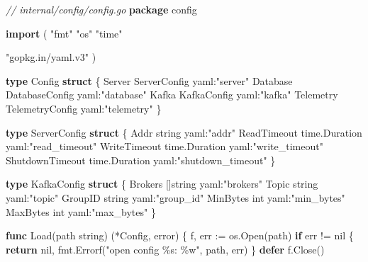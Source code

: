\documentclass[
]{article}
\newenvironment{Shaded}{}{}
\newcommand{\CommentTok}[1]{\textcolor[rgb]{0.38,0.63,0.69}{\textit{#1}}}
\newcommand{\ControlFlowTok}[1]{\textcolor[rgb]{0.00,0.44,0.13}{\textbf{#1}}}
\newcommand{\DataTypeTok}[1]{\textcolor[rgb]{0.56,0.13,0.00}{#1}}
\newcommand{\KeywordTok}[1]{\textcolor[rgb]{0.00,0.44,0.13}{\textbf{#1}}}
\newcommand{\NormalTok}[1]{#1}
\newcommand{\OperatorTok}[1]{\textcolor[rgb]{0.40,0.40,0.40}{#1}}
\newcommand{\OtherTok}[1]{\textcolor[rgb]{0.00,0.44,0.13}{#1}}
\newcommand{\StringTok}[1]{\textcolor[rgb]{0.25,0.44,0.63}{#1}}
\begin{document}
\begin{Shaded}
\begin{Highlighting}[]
\CommentTok{// internal/config/config.go}
\KeywordTok{package}\NormalTok{ config}

\KeywordTok{import} \OperatorTok{(}
    \StringTok{"fmt"}
    \StringTok{"os"}
    \StringTok{"time"}

    \StringTok{"gopkg.in/yaml.v3"}
\OperatorTok{)}

\KeywordTok{type}\NormalTok{ Config }\KeywordTok{struct} \OperatorTok{\{}
\NormalTok{    Server   ServerConfig   }\StringTok{\textasciigrave{}yaml:"server"\textasciigrave{}}
\NormalTok{    Database DatabaseConfig }\StringTok{\textasciigrave{}yaml:"database"\textasciigrave{}}
\NormalTok{    Kafka    KafkaConfig    }\StringTok{\textasciigrave{}yaml:"kafka"\textasciigrave{}}
\NormalTok{    Telemetry TelemetryConfig }\StringTok{\textasciigrave{}yaml:"telemetry"\textasciigrave{}}
\OperatorTok{\}}

\KeywordTok{type}\NormalTok{ ServerConfig }\KeywordTok{struct} \OperatorTok{\{}
\NormalTok{    Addr            }\DataTypeTok{string}        \StringTok{\textasciigrave{}yaml:"addr"\textasciigrave{}}
\NormalTok{    ReadTimeout     time}\OperatorTok{.}\NormalTok{Duration }\StringTok{\textasciigrave{}yaml:"read\_timeout"\textasciigrave{}}
\NormalTok{    WriteTimeout    time}\OperatorTok{.}\NormalTok{Duration }\StringTok{\textasciigrave{}yaml:"write\_timeout"\textasciigrave{}}
\NormalTok{    ShutdownTimeout time}\OperatorTok{.}\NormalTok{Duration }\StringTok{\textasciigrave{}yaml:"shutdown\_timeout"\textasciigrave{}}
\OperatorTok{\}}

\KeywordTok{type}\NormalTok{ KafkaConfig }\KeywordTok{struct} \OperatorTok{\{}
\NormalTok{    Brokers  }\OperatorTok{[]}\DataTypeTok{string} \StringTok{\textasciigrave{}yaml:"brokers"\textasciigrave{}}
\NormalTok{    Topic    }\DataTypeTok{string}   \StringTok{\textasciigrave{}yaml:"topic"\textasciigrave{}}
\NormalTok{    GroupID  }\DataTypeTok{string}   \StringTok{\textasciigrave{}yaml:"group\_id"\textasciigrave{}}
\NormalTok{    MinBytes }\DataTypeTok{int}      \StringTok{\textasciigrave{}yaml:"min\_bytes"\textasciigrave{}}
\NormalTok{    MaxBytes }\DataTypeTok{int}      \StringTok{\textasciigrave{}yaml:"max\_bytes"\textasciigrave{}}
\OperatorTok{\}}

\KeywordTok{func}\NormalTok{ Load}\OperatorTok{(}\NormalTok{path }\DataTypeTok{string}\OperatorTok{)} \OperatorTok{(*}\NormalTok{Config}\OperatorTok{,} \DataTypeTok{error}\OperatorTok{)} \OperatorTok{\{}
\NormalTok{    f}\OperatorTok{,}\NormalTok{ err }\OperatorTok{:=}\NormalTok{ os}\OperatorTok{.}\NormalTok{Open}\OperatorTok{(}\NormalTok{path}\OperatorTok{)}
    \ControlFlowTok{if}\NormalTok{ err }\OperatorTok{!=} \OtherTok{nil} \OperatorTok{\{}
        \ControlFlowTok{return} \OtherTok{nil}\OperatorTok{,}\NormalTok{ fmt}\OperatorTok{.}\NormalTok{Errorf}\OperatorTok{(}\StringTok{"open config \%s: \%w"}\OperatorTok{,}\NormalTok{ path}\OperatorTok{,}\NormalTok{ err}\OperatorTok{)}
    \OperatorTok{\}}
    \ControlFlowTok{defer}\NormalTok{ f}\OperatorTok{.}\NormalTok{Close}\OperatorTok{()}


\end{Highlighting}
\end{Shaded}
\end{document}
